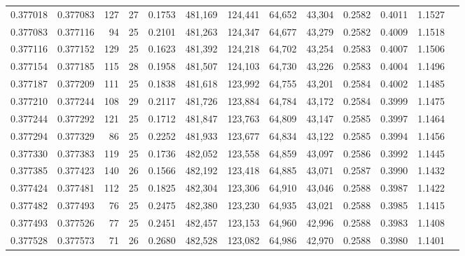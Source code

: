 \begin{tabular}{rrrrrrrrrrrrr}
0.377018 & 0.377083 &   127 &  27 &                                     0.1753 & 481,169 & 124,441 &  64,652 &  43,304 & 0.2582 & 0.4011 & 1.1527 \\
0.377083 & 0.377116 &    94 &  25 &                                     0.2101 & 481,263 & 124,347 &  64,677 &  43,279 & 0.2582 & 0.4009 & 1.1518 \\
0.377116 & 0.377152 &   129 &  25 &                                     0.1623 & 481,392 & 124,218 &  64,702 &  43,254 & 0.2583 & 0.4007 & 1.1506 \\
0.377154 & 0.377185 &   115 &  28 &                                     0.1958 & 481,507 & 124,103 &  64,730 &  43,226 & 0.2583 & 0.4004 & 1.1496 \\
0.377187 & 0.377209 &   111 &  25 &                                     0.1838 & 481,618 & 123,992 &  64,755 &  43,201 & 0.2584 & 0.4002 & 1.1485 \\
0.377210 & 0.377244 &   108 &  29 &                                     0.2117 & 481,726 & 123,884 &  64,784 &  43,172 & 0.2584 & 0.3999 & 1.1475 \\
0.377244 & 0.377292 &   121 &  25 &                                     0.1712 & 481,847 & 123,763 &  64,809 &  43,147 & 0.2585 & 0.3997 & 1.1464 \\
0.377294 & 0.377329 &    86 &  25 &                                     0.2252 & 481,933 & 123,677 &  64,834 &  43,122 & 0.2585 & 0.3994 & 1.1456 \\
0.377330 & 0.377383 &   119 &  25 &                                     0.1736 & 482,052 & 123,558 &  64,859 &  43,097 & 0.2586 & 0.3992 & 1.1445 \\
0.377385 & 0.377423 &   140 &  26 &                                     0.1566 & 482,192 & 123,418 &  64,885 &  43,071 & 0.2587 & 0.3990 & 1.1432 \\
0.377424 & 0.377481 &   112 &  25 &                                     0.1825 & 482,304 & 123,306 &  64,910 &  43,046 & 0.2588 & 0.3987 & 1.1422 \\
0.377482 & 0.377493 &    76 &  25 &                                     0.2475 & 482,380 & 123,230 &  64,935 &  43,021 & 0.2588 & 0.3985 & 1.1415 \\
0.377493 & 0.377526 &    77 &  25 &                                     0.2451 & 482,457 & 123,153 &  64,960 &  42,996 & 0.2588 & 0.3983 & 1.1408 \\
0.377528 & 0.377573 &    71 &  26 &                                     0.2680 & 482,528 & 123,082 &  64,986 &  42,970 & 0.2588 & 0.3980 & 1.1401 \\

\end{tabular}
